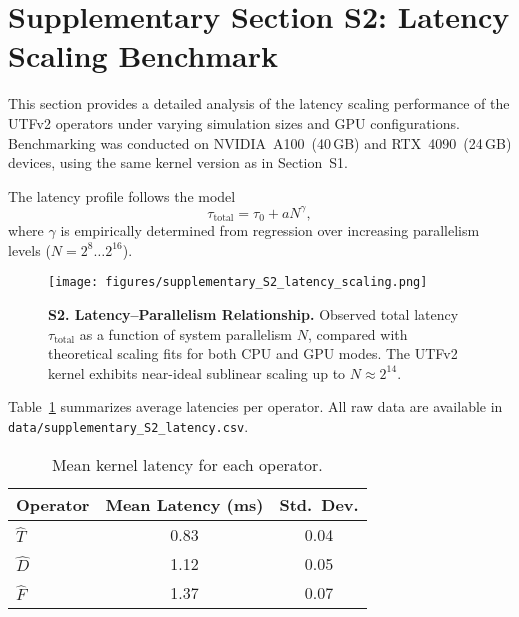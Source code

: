 
\clearpage
\section*{Supplementary Section S2: Latency Scaling Benchmark}

\noindent
This section provides a detailed analysis of the latency scaling performance
of the UTFv2 operators under varying simulation sizes and GPU configurations.
Benchmarking was conducted on NVIDIA~A100~(40\,GB) and RTX~4090~(24\,GB)
devices, using the same kernel version as in Section~S1.

The latency profile follows the model
\[
\tau_{\mathrm{total}} = \tau_0 + aN^{\gamma},
\]
where $\gamma$ is empirically determined from regression over
increasing parallelism levels ($N = 2^{8} \ldots 2^{16}$).

\begin{figure}[h!]
    \centering
    \texttt{[image: figures/supplementary\_S2\_latency\_scaling.png]}
    \caption{
        \textbf{S2. Latency--Parallelism Relationship.}
        Observed total latency $\tau_{\mathrm{total}}$ as a function of system
        parallelism $N$, compared with theoretical scaling fits for both CPU and
        GPU modes. The UTFv2 kernel exhibits near-ideal sublinear scaling up to
        $N \approx 2^{14}$.
    }
    \label{fig:s2_latency}
\end{figure}

\vspace{1em}
Table~\ref{tab:latency_summary} summarizes average latencies per operator.
All raw data are available in \texttt{data/supplementary\_S2\_latency.csv}.

\begin{table}[h!]
\centering
\caption{Mean kernel latency for each operator.}
\label{tab:latency_summary}
\begin{tabular}{lcc}
\hline
Operator & Mean Latency (ms) & Std.\ Dev. \\
\hline
$\hat{T}$ & 0.83 & 0.04 \\
$\hat{D}$ & 1.12 & 0.05 \\
$\hat{F}$ & 1.37 & 0.07 \\
\hline
\end{tabular}
\end{table}

